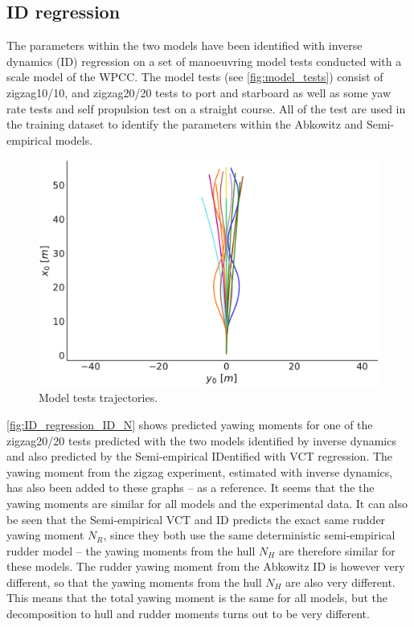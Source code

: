 \subsection{ID regression}
\label{sec:result_ID_regression}
The parameters within the two models have been identified with inverse dynamics (ID) regression on a set of manoeuvring model tests conducted with a scale model of the WPCC. The model tests (see \autoref{fig:model_tests}) consist of zigzag10/10, and zigzag20/20 tests to port and starboard as well as some yaw rate tests and self propulsion test on a straight course. All of the test are used in the training dataset to identify the parameters within the Abkowitz and Semi-empirical models.
\begin{figure}[h!]
    \includegraphics[width=\columnwidth]{figures/result_ID_regression.model_tests.pdf}
    \caption{Model tests trajectories.}
    \label{fig:model_tests}
\end{figure}
\autoref{fig:ID_regression_ID_N} shows predicted yawing moments for one of the zigzag20/20 tests predicted with the two models identified by inverse dynamics and also predicted by the Semi-empirical IDentified with VCT regression. The yawing moment from the zigzag experiment, estimated with inverse dynamics, has also been added to these graphs -- as a reference. It seems that the the yawing moments are similar for all models and the experimental data. It can also be seen that the Semi-empirical VCT and ID predicts the exact same rudder yawing moment $N_R$, since they both use the same deterministic semi-empirical rudder model -- the yawing moments from the hull $N_H$ are therefore similar for these models. The rudder yawing moment from the Abkowitz ID is however very different, so that the yawing moments from the hull $N_H$ are also very different. This means that the total yawing moment is the same for all models, but the decomposition to hull and rudder moments turns out to be very different.
